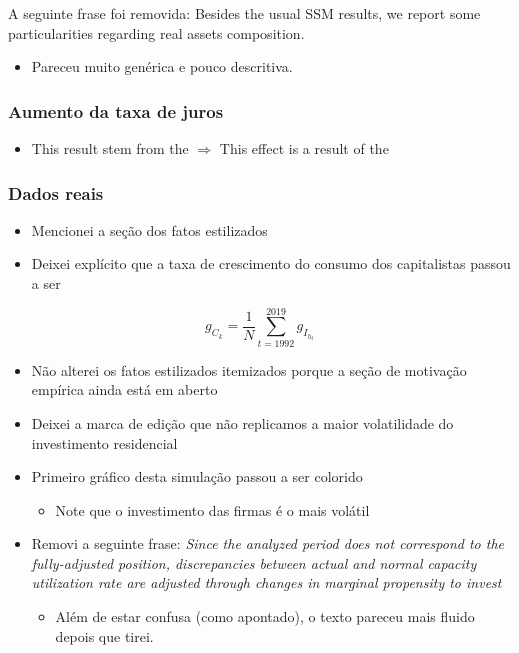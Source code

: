 \documentclass[11pt]{article}
\begin{document}
A seguinte frase foi removida: Besides the usual SSM results, we report some particularities regarding real assets composition.

\begin{itemize}
\item Pareceu muito genérica e pouco descritiva.
\end{itemize}


\subsubsection*{Aumento da taxa de juros}
\label{sec:orgbb6354d}
\begin{itemize}
\item This result stem from the \(\Rightarrow\) This effect is a result of the
\end{itemize}

\subsubsection*{Dados reais}
\label{sec:org5ca06da}

\begin{itemize}
\item Mencionei a seção dos fatos estilizados
\item Deixei explícito que a taxa de crescimento do consumo dos capitalistas passou a ser
\end{itemize}

\begin{equation}
  \label{gck_real}
  g_{C_k} = \frac{1}{N} \sum_{t=1992}^{2019} g_{I_{h_{t}}}
\end{equation}

\begin{itemize}
\item Não alterei os fatos estilizados itemizados porque a seção de motivação empírica ainda está em aberto
\item Deixei a marca de edição que não replicamos a maior volatilidade do investimento residencial
\item Primeiro gráfico desta simulação passou a ser colorido
\begin{itemize}
\item Note que o investimento das firmas é o mais volátil
\end{itemize}
\item Removi a seguinte frase: \emph{Since the analyzed period does not correspond to the fully-adjusted position, discrepancies between actual and normal capacity utilization rate are adjusted through changes in marginal propensity to invest}
\begin{itemize}
\item Além de estar confusa (como apontado), o texto pareceu mais fluido depois que tirei.
\end{itemize}
\end{itemize}
\end{document}
